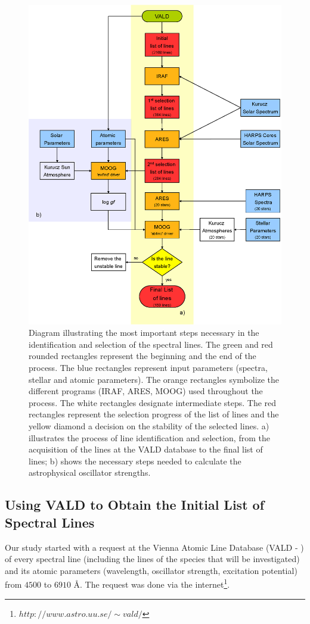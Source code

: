 \documentclass[dvips,12pt,a4paper]{report}
\begin{document}
{\begin{figure}[h]
\centering
\includegraphics[trim=0mm 0mm 0mm 1mm, clip,height= 12 cm]{pics/parte3/eskemafinalv6.eps}
\caption{Diagram illustrating the most important steps necessary in the identification and selection of the spectral lines. The green and red rounded rectangles represent the beginning and the end of the process. The blue rectangles represent input parameters (spectra, stellar and atomic parameters). The orange rectangles symbolize the different programs (IRAF, ARES, MOOG) used throughout the process. The white rectangles designate intermediate steps. The red rectangles represent the selection progress of the list of lines and the yellow diamond a decision on the stability of the selected lines. a) illustrates the process of line identification and selection, from the acquisition of the lines at the VALD database to the final list of lines; b) shows the necessary steps needed to calculate the astrophysical oscillator strengths. }
\label{esquema}
\end{figure}



\subsection {Using VALD to Obtain the Initial List of Spectral Lines}
\label{VALD}
Our study started with a request at the Vienna Atomic Line Database (VALD - \citeauthor{Kupka-1999} \citeyear{Kupka-1999})  of every spectral line (including the lines of the species that will be investigated) and its atomic parameters (wavelength, oscillator strength, excitation potential) %
from $4500$ to $6910$ \AA. The request was done via the internet\footnote{$http://www.astro.uu.se/\sim vald/$}. %

}
\end{document}
